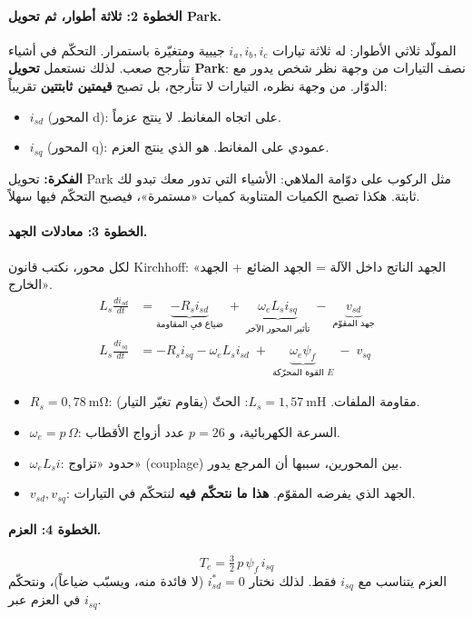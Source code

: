 \documentclass[11pt,a4paper]{article}
\newcommand{\fr}[1]{\textfrench{#1}}
\newcommand{\Fikra}{\textbf{الفكرة: }}
\begin{document}
\paragraph{الخطوة 2: ثلاثة أطوار، ثم تحويل \fr{Park}.}
المولّد ثلاثي الأطوار: له ثلاثة تيارات $i_a, i_b, i_c$ جيبية ومتغيّرة باستمرار. التحكّم في أشياء
تتأرجح صعب. لذلك نستعمل \textbf{تحويل \fr{Park}}: نصف التيارات من وجهة نظر شخص يدور مع الدوّار.
من وجهة نظره، التيارات لا تتأرجح، بل تصبح \textbf{قيمتين ثابتتين} تقريباً:
\begin{itemize}
\item $i_{sd}$ (المحور \fr{d}): على اتجاه المغانط. لا ينتج عزماً.
\item $i_{sq}$ (المحور \fr{q}): عمودي على المغانط. هو الذي ينتج العزم.
\end{itemize}
\begin{fikra}
\Fikra
تحويل \fr{Park} مثل الركوب على دوّامة الملاهي: الأشياء التي تدور معك تبدو لك ثابتة.
هكذا تصبح الكميات المتناوبة كميات «مستمرة»، فيصبح التحكّم فيها سهلاً.
\end{fikra}

\paragraph{الخطوة 3: معادلات الجهد.}
لكل محور، نكتب قانون \fr{Kirchhoff}: «الجهد الناتج داخل الآلة = الجهد الضائع + الجهد الخارج».
\begin{align}
L_s\frac{di_{sd}}{dt} &= \underbrace{-R_s i_{sd}}_{\text{ضياع في المقاومة}}
\;+\;\underbrace{\omega_e L_s i_{sq}}_{\text{تأثير المحور الآخر}}
\;-\;\underbrace{v_{sd}}_{\text{جهد المقوّم}}\\
L_s\frac{di_{sq}}{dt} &= -R_s i_{sq} - \omega_e L_s i_{sd}
\;+\;\underbrace{\omega_e\psi_f}_{\text{القوة المحرّكة }E} \;-\; v_{sq}
\end{align}
\begin{itemize}
\item $R_s=0{,}78\ \mathrm{m\Omega}$: مقاومة الملفات. $L_s=1{,}57\ \mathrm{mH}$: الحثّ (يقاوم تغيّر التيار).
\item $\omega_e = p\,\Omega$: السرعة الكهربائية، و $p=26$ عدد أزواج الأقطاب.
\item $\omega_e L_s i$: حدود «تزاوج» (\fr{couplage}) بين المحورين، سببها أن المرجع يدور.
\item $v_{sd}, v_{sq}$: الجهد الذي يفرضه المقوّم. \textbf{هذا ما نتحكّم فيه} لنتحكّم في التيارات.
\end{itemize}

\paragraph{الخطوة 4: العزم.}
\begin{equation}
T_e = \tfrac32\, p\, \psi_f\, i_{sq}
\end{equation}
العزم يتناسب مع $i_{sq}$ فقط. لذلك نختار $i_{sd}^*=0$ (لا فائدة منه، ويسبّب ضياعاً)، ونتحكّم في
العزم عبر $i_{sq}$.
\end{document}
